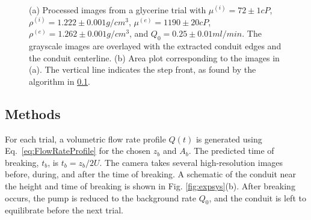 \documentclass{jfm}
\newcommand{\ifl}{^{(i)}}
\newcommand{\efl}{^{(e)}}
\begin{document}
\begin{figure}
\centering
{}
\caption{(a) Processed images from a glycerine trial with $\mu\ifl = 72\pm1 \si{cP}$, $\rho\ifl = 1.222\pm0.001 \si{g/cm^3}$, $\mu\efl = 1190\pm 20 \si{cP}$, $\rho\efl = 1.262\pm0.001\si{g/cm^3}$, and $Q_0 = 0.25\pm 0.01 \si{ml/min}$. The grayscale images are overlayed with the extracted conduit edges and the conduit centerline. (b) Area plot corresponding to the images in (a). The vertical line indicates the step front, as found by the algorithm in \ref{sec:Methods}.}
\label{fig:BreakEdge}
\end{figure}

    
	\subsection{Methods}\label{sec:Methods}
	For each trial, a volumetric flow rate profile $Q(t)$ is generated using Eq.~\ref{eq:FlowRateProfile} for the chosen $z_b$ and $A_b$.
	The predicted time of breaking, $t_b$, is $t_b=z_b/2U$.
	The camera takes several high-resolution images before, during, and after the time of breaking.
	A schematic of the conduit near the height and time of breaking is shown in Fig. \ref{fig:expsys}(b).
	After breaking occurs, the pump is reduced to the background rate $Q_0$, and the conduit is left to equilibrate before the next trial.
	
\end{document}
